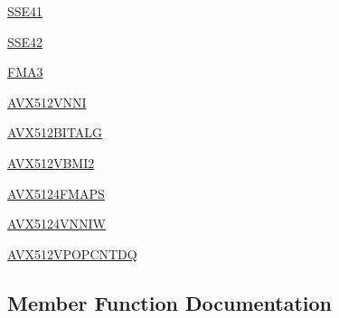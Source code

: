 \begin{DoxyCompactItemize}
\item 
\hyperlink{classnumpy_1_1core_1_1tests_1_1test__cpu__features_1_1Test__X86__Features_a7029b4f7f977df9f464a1027fa5772d9}{S\+S\+E41}
\item 
\hyperlink{classnumpy_1_1core_1_1tests_1_1test__cpu__features_1_1Test__X86__Features_a9e49447b987fd1d2f7a4a4f3e747d2f4}{S\+S\+E42}
\item 
\hyperlink{classnumpy_1_1core_1_1tests_1_1test__cpu__features_1_1Test__X86__Features_a11d5ecd6ec29c51003f8d46cbd53fd09}{F\+M\+A3}
\item 
\hyperlink{classnumpy_1_1core_1_1tests_1_1test__cpu__features_1_1Test__X86__Features_ac03a9605c943af62af853f7a1c4970e2}{A\+V\+X512\+V\+N\+NI}
\item 
\hyperlink{classnumpy_1_1core_1_1tests_1_1test__cpu__features_1_1Test__X86__Features_ace15b0c5a7800cd79a05e0470f0699f7}{A\+V\+X512\+B\+I\+T\+A\+LG}
\item 
\hyperlink{classnumpy_1_1core_1_1tests_1_1test__cpu__features_1_1Test__X86__Features_abbae267e69db156a3268d9a4a72105cb}{A\+V\+X512\+V\+B\+M\+I2}
\item 
\hyperlink{classnumpy_1_1core_1_1tests_1_1test__cpu__features_1_1Test__X86__Features_a10f5b2088a556bb8b367e573a78a47df}{A\+V\+X5124\+F\+M\+A\+PS}
\item 
\hyperlink{classnumpy_1_1core_1_1tests_1_1test__cpu__features_1_1Test__X86__Features_a4936bc5976a5b075f294bd0fda35388c}{A\+V\+X5124\+V\+N\+N\+IW}
\item 
\hyperlink{classnumpy_1_1core_1_1tests_1_1test__cpu__features_1_1Test__X86__Features_a65ee82061610dc474e501fb75bf73867}{A\+V\+X512\+V\+P\+O\+P\+C\+N\+T\+DQ}
\end{DoxyCompactItemize}


\subsection{Member Function Documentation}
\mbox{\label{classnumpy_1_1core_1_1tests_1_1test__cpu__features_1_1Test__X86__Features_a88df8c18e20942f2d08c7d1078e8af19}} 
